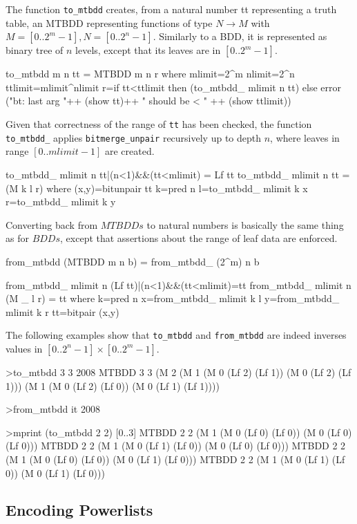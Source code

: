 \documentclass[]{INCLUDES/llncs}
\begin{document}
The function  {\tt to\_mtbdd} creates,
from a natural number tt representing a truth table,
an MTBDD representing
functions of type $N \rightarrow M$ with $M=[0..2^m-1], N=[0..2^n-1]$.
Similarly to a BDD, it is represented as binary tree 
of $n$ levels, except that its leaves are in $[0..{2^m}-1]$.
\begin{code}
to_mtbdd m n tt = MTBDD m n r where 
  mlimit=2^m
  nlimit=2^n
  ttlimit=mlimit^nlimit
  r=if tt<ttlimit 
    then (to_mtbdd_ mlimit n tt)
    else error 
      ("bt: last arg "++ (show tt)++
      " should be < " ++ (show ttlimit))
\end{code}
Given that correctness of the range of
{\tt tt} has been checked, the function {\tt to\_mtbdd\_} 
applies {\tt bitmerge\_unpair} 
recursively up to depth $n$, where
leaves in range $[0..mlimit-1]$ are created.
\begin{code}  
to_mtbdd_ mlimit n tt|(n<1)&&(tt<mlimit) = Lf tt
to_mtbdd_ mlimit n tt = (M k l r) where 
   (x,y)=bitunpair tt
   k=pred n
   l=to_mtbdd_ mlimit k x
   r=to_mtbdd_ mlimit k y
\end{code}
Converting back from $MTBDDs$ to natural numbers is
basically the same thing as for $BDDs$, except that
assertions about the range of leaf data are enforced.
\begin{code}
from_mtbdd (MTBDD m n b) = from_mtbdd_ (2^m) n b

from_mtbdd_ mlimit n (Lf tt)|(n<1)&&(tt<mlimit)=tt
from_mtbdd_ mlimit n (M _ l r) = tt where 
   k=pred n
   x=from_mtbdd_ mlimit k l
   y=from_mtbdd_ mlimit k r
   tt=bitpair (x,y)
\end{code}
The following examples show that {\tt to\_mtbdd} and {\tt from\_mtbdd}
are indeed inverses values in $[0..2^n-1] \times [0..2^m-1]$. 
\begin{codex}
>to_mtbdd 3 3 2008
  MTBDD 3 3 
    (M 2 
      (M 1 
         (M 0 (Lf 2) (Lf 1)) 
         (M 0 (Lf 2) (Lf 1))) 
      (M 1 
         (M 0 (Lf 2) (Lf 0)) 
         (M 0 (Lf 1) (Lf 1))))

>from_mtbdd it
2008

>mprint (to_mtbdd 2 2) [0..3]
  MTBDD 2 2 
    (M 1 (M 0 (Lf 0) (Lf 0)) (M 0 (Lf 0) (Lf 0)))
  MTBDD 2 2 
    (M 1 (M 0 (Lf 1) (Lf 0)) (M 0 (Lf 0) (Lf 0)))
  MTBDD 2 2 
    (M 1 (M 0 (Lf 0) (Lf 0)) (M 0 (Lf 1) (Lf 0)))
  MTBDD 2 2 
    (M 1 (M 0 (Lf 1) (Lf 0)) (M 0 (Lf 1) (Lf 0)))
\end{codex}

\subsection{Encoding Powerlists}
\end{document}
